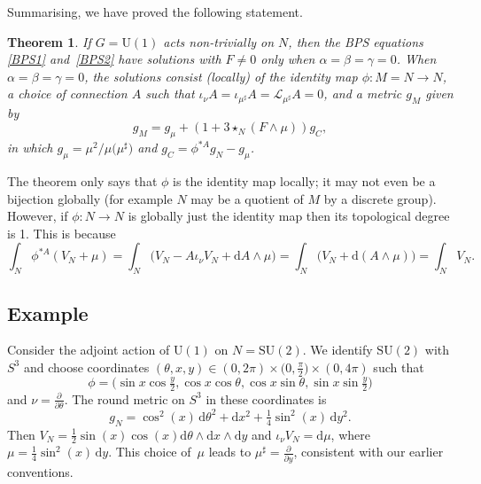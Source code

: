 \documentclass[pdftex]{sigma}
\newcommand{\SU}{{\mathrm{SU}}}
\newcommand{\U}{{\mathrm{U}}}
\newcommand{\1}{{\mathbb{1}}}
\def \d{\mathrm{d}}
\numberwithin{equation}{section}
\newtheorem{Theorem}{Theorem}[section]
\begin{document}
Summarising, we have proved the following statement.

\begin{Theorem}\label{thm:classification-S1}
If $G=\U(1)$ acts non-trivially on $N$, then the BPS equations \eqref{BPS1} and~\eqref{BPS2} have solutions with $F\neq0$ only when $\alpha=\beta=\gamma=0$. When $\alpha=\beta=\gamma=0$, the solutions consist (locally) of the identity map $\phi\colon M=N\to N$, a choice of connection $A$ such that $\iota_\nu A = \iota_{\mu^\sharp}A=\mathcal{L}_{\mu^\sharp}A=0$,
and a metric $g_M$ given by
\begin{equation*}
g_M = g_\mu + (1+3\star_N (F\wedge\mu))g_C,
\end{equation*}
in which $g_\mu=\mu^2/\mu\big(\mu^\sharp\big)$ and $g_C=\phi^{\ast A}g_N-g_\mu$.
\end{Theorem}
The theorem only says that $\phi$ is the identity map locally; it may not even be a bijection globally (for example $N$ may be a quotient of $M$ by a discrete group). However, if $\phi\colon N\to N$ is globally just the identity map then its topological degree is 1. This is because
\begin{equation*}
\int_N\phi^{\ast A}(V_N+\mu) = \int_N\big( V_N - A\iota_\nu V_N + \d A\wedge \mu\big) = \int_N\big(V_N + \d(A\wedge\mu)\big) = \int_N V_N.
\end{equation*}

\subsection{Example}

Consider the adjoint action of $\U(1)$ on $N=\SU(2)$. We identify $\SU(2)$ with $S^3$ and choose coordinates $(\theta,x,y)\in(0,2\pi)\times \big(0,\frac{\pi}{2}\big)\times (0,4\pi)$ such that
\begin{equation*}
\phi=\bigl( \sin x\cos\tfrac{y}{2},\cos x\cos \theta,\cos x\sin\theta , \sin x\sin\tfrac{y}{2}\bigr)
\end{equation*}
and $\nu=\frac{\partial}{\partial \theta}$. The round metric on $S^3$ in these coordinates is
\begin{equation*}
g_N = \cos^2(x)\,\d\theta^2 + \d x^2 + \tfrac{1}{4}\sin^2 (x)\,\d y^2.
\end{equation*}
Then $V_N=\frac12\sin (x)\cos (x) \d\theta\wedge \d x\wedge \d y$ and $\iota_\nu V_N =\d\mu$, where $\mu=\frac{1}{4}\sin^2 (x)\,\d y$. This choice of~$\mu$ leads to $\mu^\sharp=\frac{\partial}{\partial y}$, consistent with our earlier conventions.
\end{document}
